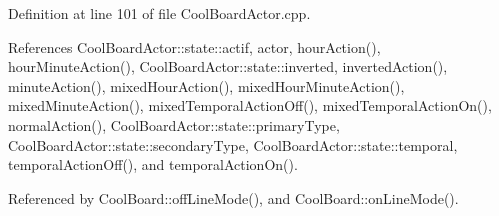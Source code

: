 Definition at line 101 of file Cool\+Board\+Actor.\+cpp.



References Cool\+Board\+Actor\+::state\+::actif, actor, hour\+Action(), hour\+Minute\+Action(), Cool\+Board\+Actor\+::state\+::inverted, inverted\+Action(), minute\+Action(), mixed\+Hour\+Action(), mixed\+Hour\+Minute\+Action(), mixed\+Minute\+Action(), mixed\+Temporal\+Action\+Off(), mixed\+Temporal\+Action\+On(), normal\+Action(), Cool\+Board\+Actor\+::state\+::primary\+Type, Cool\+Board\+Actor\+::state\+::secondary\+Type, Cool\+Board\+Actor\+::state\+::temporal, temporal\+Action\+Off(), and temporal\+Action\+On().



Referenced by Cool\+Board\+::off\+Line\+Mode(), and Cool\+Board\+::on\+Line\+Mode().

